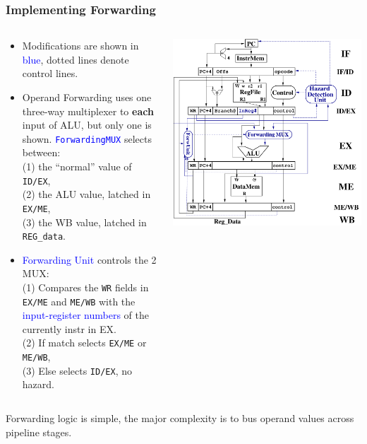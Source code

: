 \documentclass{beamer}
\newcommand{\blue}[1]{\textcolor{Blue}{{#1}}}
\renewcommand{\emph}[1]{\textcolor{structure}{#1}}
\newcommand{\emp}[1]{\textcolor{DikuRed}{ #1}}
\begin{document}
\begin{frame}[fragile,t]
\frametitle{Implementing Forwarding}

\begin{columns}
\begin{scriptsize}
\begin{itemize}
\item Modifications are shown in \blue{blue}, dotted lines denote
            control lines.\bigskip
\item \emph{Operand Forwarding} uses one three-way multiplexer 
            to {\bf each} input of ALU, but only one is shown.
            \blue{\tt ForwardingMUX} selects between:\\
            (1) the ``normal'' value of {\tt ID/EX},\\ %
            (2) the ALU value, latched in {\tt EX/ME},\\
            (3) the WB value, latched in {\tt REG\_data}.\bigskip
           
\item \blue{Forwarding Unit} controls the 2 MUX:\\
            (1) Compares the {\tt WR} fields in {\tt EX/ME} and {\tt ME/WB} with
                 the \blue{input-register numbers} of the currently instr in EX.\\
            (2) If match selects {\tt EX/ME} or {\tt ME/WB},\\
            (3) Else selects {\tt ID/EX}, no hazard. 
\end{itemize}
\end{scriptsize}
\vspace{-2ex}
\includegraphics[width=37ex]{Figures/ClassicPipelineDH}
\end{columns}
\bigskip
\emph{Forwarding logic is simple}, \emp{the major complexity is 
to bus operand values across pipeline stages}.

\end{frame}
\end{document}
